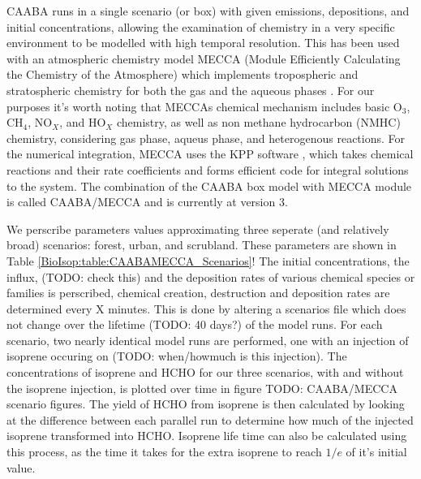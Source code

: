     CAABA runs in a single scenario (or box) with given emissions, depositions, and initial concentrations, allowing the examination of chemistry in a very specific environment to be modelled with high temporal resolution.
    This has been used with an atmospheric chemistry model MECCA (Module Efficiently Calculating the Chemistry of the Atmosphere) which implements tropospheric and stratospheric chemistry for both the gas and the aqueous phases \citep{Sander2005}.
    For our purposes it's worth noting that MECCAs chemical mechanism includes basic O$_3$, CH$_4$, NO$_X$, and HO$_X$ chemistry, as well as non methane hydrocarbon (NMHC) chemistry, considering gas phase, aqueus phase, and heterogenous reactions. \citep{Sander2005}
    For the numerical integration, MECCA uses the KPP software \citep{SanduSander2006}, which takes chemical reactions and their rate coefficients and forms efficient code for integral solutions to the system.
    The combination of the CAABA box model with MECCA module is called CAABA/MECCA and is currently at version 3.
    
    
    We perscribe parameters values approximating three seperate (and relatively broad) scenarios: forest, urban, and scrubland.
    These parameters are shown in Table \ref{BioIsop:table:CAABAMECCA_Scenarios}!
    The initial concentrations, the influx, (TODO: check this) and the deposition rates of various chemical species or families is perscribed, chemical creation, destruction and deposition rates are determined every X minutes.
    This is done by altering a scenarios file which does not change over the lifetime (TODO: 40 days?) of the model runs.
    For each scenario, two nearly identical model runs are performed, one with an injection of isoprene occuring on (TODO: when/howmuch is this injection).
    The concentrations of isoprene and HCHO for our three scenarios, with and without the isoprene injection, is plotted over time in figure TODO: CAABA/MECCA scenario figures.
    The yield of HCHO from isoprene is then calculated by looking at the difference between each parallel run to determine how much of the injected isoprene transformed into HCHO.
    Isoprene life time can also be calculated using this process, as the time it takes for the extra isoprene to reach $1/e$ of it's initial value.
    
